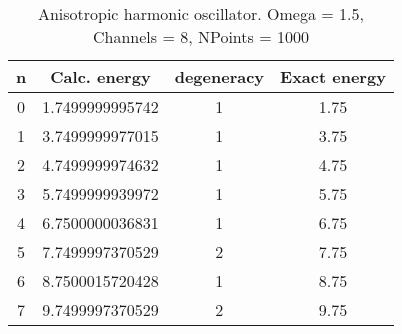 \documentclass[12pt]{article}
\begin{document}
\begin{table}[H]
    \begin{center}
    \caption{Anisotropic harmonic oscillator. Omega = 1.5, Channels = 8, NPoints = 1000}
    \begin{tabular}{cccc}
    \toprule[1.5pt]
    n & Calc. energy & degeneracy & Exact energy \\[1.5pt]
    \hline
    0 & 1.7499999995742 & 1 & 1.75 \\ 
    1 & 3.7499999977015 & 1 & 3.75 \\ 
    2 & 4.7499999974632 & 1 & 4.75 \\
    3 & 5.7499999939972 & 1 & 5.75 \\
    4 & 6.7500000036831 & 1 & 6.75 \\
    5 & 7.7499997370529 & 2 & 7.75 \\
    6 & 8.7500015720428 & 1 & 8.75 \\
    7 & 9.7499997370529 & 2 & 9.75 \\
    \bottomrule
    \end{tabular}
    \end{center}
\end{table}
\end{document}
